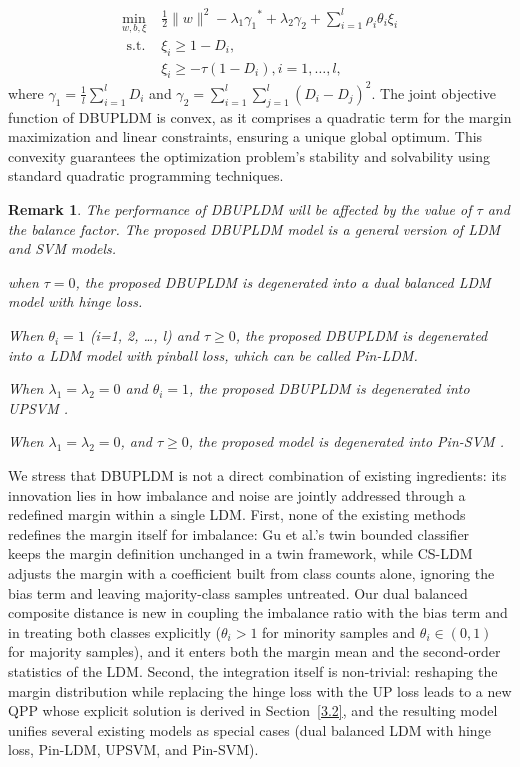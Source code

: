 \documentclass[a4paper]{cas-sc}
\newtheorem{remark}{Remark}
\begin{document}
\begin{equation}
\label{qpp}
\begin{aligned}
\min _{w, b, \xi} & \frac{1}{2}\|w\|^{2}-\lambda_{1} {\gamma _1}^*+\lambda_{2} \gamma_{2}+\sum_{i=1}^{l} \rho_{i}\theta_{i} \xi_{i} \\
\text { s.t. } & \xi_{i} \geq 1-D_{i}, \\
\quad & \xi_{i} \geq-\tau\left(1-D_{i}\right), i=1, \ldots, l,
\end{aligned}
\end{equation}
where $\gamma_{1}=\frac{1}{l} \sum_{i=1}^{l} D_{i}$ and $\gamma_{2}=\sum_{i=1}^{l} \sum_{j=1}^{l}\left(D_{i}-D_{j}\right)^{2}$.
{\color{blue}The joint objective function of DBUPLDM is convex, as it comprises a quadratic term for the margin maximization and linear constraints, ensuring a unique global optimum. This convexity guarantees the optimization problem's stability and solvability using standard quadratic programming techniques.}

\begin{remark}
The performance of DBUPLDM will be affected by the value of $\tau$ and the balance factor. The proposed DBUPLDM model is a general version of LDM and SVM models.
\item[$\bullet$] when $\tau = 0$, the proposed DBUPLDM is degenerated into a dual balanced LDM model with hinge loss.
\item[$\bullet$] When $\theta_i=1$ (i=1, 2, \ldots, l) and $\tau \geq 0$, the proposed DBUPLDM is degenerated into a LDM model with pinball loss, which can be called Pin-LDM.
\item[$\bullet$] When $\lambda_{1} = \lambda_{2} = 0$ and $\theta_i=1$, the proposed DBUPLDM is degenerated into UPSVM \citep{anand2021improvement}.
\item[$\bullet$] When $\lambda_{1} = \lambda_{2} = 0$, and $\tau \geq 0$, the proposed model is degenerated into Pin-SVM \citep{huang2013support,huang2016solution}.
\end{remark}

{\color{red}We stress that DBUPLDM is not a direct combination of existing ingredients: its innovation lies in how imbalance and noise are jointly addressed through a redefined margin within a single LDM. First, none of the existing methods redefines the margin itself for imbalance: Gu et al.'s twin bounded classifier~\citep{gu2024twin} keeps the margin definition unchanged in a twin framework, while CS-LDM~\citep{cheng2016cost} adjusts the margin with a coefficient built from class counts alone, ignoring the bias term and leaving majority-class samples untreated. Our dual balanced composite distance is new in coupling the imbalance ratio with the bias term and in treating both classes explicitly ($\theta_i>1$ for minority samples and $\theta_i\in(0,1)$ for majority samples), and it enters both the margin mean and the second-order statistics of the LDM. Second, the integration itself is non-trivial: reshaping the margin distribution while replacing the hinge loss with the UP loss leads to a new QPP whose explicit solution is derived in Section~\ref{3.2}, and the resulting model unifies several existing models as special cases (dual balanced LDM with hinge loss, Pin-LDM, UPSVM, and Pin-SVM).}
\end{document}
